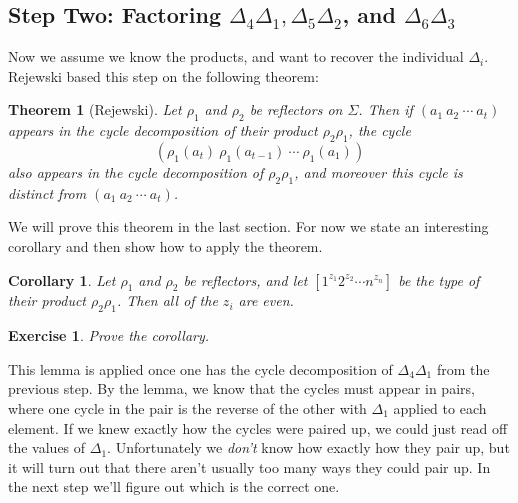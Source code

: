 \documentclass[11pt]{article}
\newtheorem{corollary}{Corollary}
\newtheorem{exercise}{Exercise}
\newtheorem{theorem}{Theorem}
\begin{document}
\subsection{Step Two: Factoring $\Delta_4\Delta_1,\Delta_5\Delta_2$,
        and $\Delta_6\Delta_3$}

Now we assume we know the products, and want to recover the individual
$\Delta_i$. Rejewski based this step on the following theorem:
\begin{theorem}[Rejewski]\label{thm:rejewski}
    Let $\rho_1$ and $\rho_2$ be reflectors on $\Sigma$.  Then if $(a_1\ a_2\
    \cdots\ a_t)$ appears in the cycle decomposition of their product
    $\rho_2\rho_1$, the cycle
    \[
        (\rho_1(a_t)\ \rho_1(a_{t-1})\ \cdots\ \rho_1(a_1))
    \]
    also appears in the cycle decomposition of $\rho_2\rho_1$, and moreover
    this cycle is distinct from $(a_1\ a_2\ \cdots\ a_t)$.
\end{theorem}
We will prove this theorem in the last section. For now we state an
interesting corollary and then show how to apply the theorem.
\begin{corollary}
    Let $\rho_1$ and $\rho_2$ be reflectors, and let $[1^{z_1}2^{z_2}\cdots
    n^{z_n}]$ be the type of their product $\rho_2\rho_1$. Then all of the
    $z_i$ are even.
\end{corollary}
\begin{exercise}
    Prove the corollary.
\end{exercise}

This lemma is applied once one has the cycle decomposition of
$\Delta_4\Delta_1$ from the previous step. By the lemma, we know that the
cycles must appear in pairs, where one cycle in the pair is the reverse of the
other with $\Delta_1$ applied to each element. If we knew exactly how the
cycles were paired up, we could just read off the values of $\Delta_1$.
Unfortunately we \emph{don't} know how exactly how they pair up, but it
will turn out that there aren't usually too many ways they could pair up.
In the next step we'll figure out which is the correct one.
\end{document}
